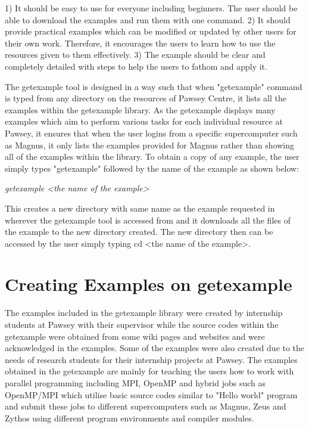 \documentclass[journal]{IEEEtran}
\begin{document}
1) It should be easy to use for everyone including beginners. The user should be able to download the examples and run them with one command.
2) It should provide practical examples which can be modified or updated by other users for their own work. Therefore, it encourages the users to learn
how to use the resources given to them effectively.
3) The example should be clear and completely detailed with steps to help the users to fathom and apply it.

The getexample tool is designed in a way such that when "getexample" command is typed from any directory on the resources of Pawsey Centre, it lists all 
the examples within the getexample library. As the getexample displays many examples which aim to perform various tasks for each individual resource at
Pawsey, it ensures that when the user logins from a specific supercomputer such as Magnus, it only lists the examples provided for Magnus rather than
showing all of the examples within the library. To obtain a copy of any example, the user simply types "getexample" followed by the name of the example 
as shown below:

\emph{getexample <the name of the example>}

This creates a new directory with same name as the example requested in wherever the getexample tool is accessed from and it downloads all the files of
the example to the new directory created. The new directory then can be accessed by the user simply typing cd <the name of the example>. 
 
\section{Creating Examples on getexample}

The examples included in the getexample library were created by internship students at Pawsey with their supervisor while the source codes within the
getexample were obtained from some wiki pages and websites and were acknowledged in the examples. Some of the examples were also created due to the
needs of research students for their internship projects at Pawsey. The examples obtained in the getexample are mainly for teaching the users how to work
with parallel programming including MPI, OpenMP and hybrid jobs such as OpenMP/MPI which utilise basic source codes similar to "Hello world" program and
submit these jobs to different supercomputers such as Magnus, Zeus and Zythos using different program environments and compiler modules. 
\end{document}
